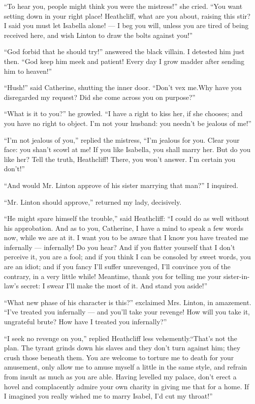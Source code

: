 \par “To hear you, people might think you were the mistress!” she cried. “You want setting down in your right place! Heathcliff, what are you about, raising this stir? I said you must let Isabella alone! — I beg you will, unless you are tired of being received here, and wish Linton to draw the bolts against you!”
\par “God forbid that he should try!” answered the black villain. I detested him just then. “God keep him meek and patient! Every day I grow madder after sending him to heaven!”
\par “Hush!” said Catherine, shutting the inner door. “Don't vex me.Why have you disregarded my request? Did she come across you on purpose?”
\par “What is it to you?” he growled. “I have a right to kiss her, if she chooses; and you have no right to object. I'm not your husband: you needn't be jealous of me!”
\par “I'm not jealous of you,” replied the mistress, “I'm jealous for you. Clear your face: you shan't scowl at me! If you like Isabella, you shall marry her. But do you like her? Tell the truth, Heathcliff! There, you won't answer. I'm certain you don't!”
\par “And would Mr. Linton approve of his sister marrying that man?” I inquired.
\par “Mr. Linton should approve,” returned my lady, decisively.
\par “He might spare himself the trouble,” said Heathcliff: “I could do as well without his approbation. And as to you, Catherine, I have a mind to speak a few words now, while we are at it. I want you to be aware that I know you have treated me infernally — infernally! Do you hear? And if you flatter yourself that I don't perceive it, you are a fool; and if you think I can be consoled by sweet words, you are an idiot; and if you fancy I'll suffer unrevenged, I'll convince you of the contrary, in a very little while! Meantime, thank you for telling me your sister-in-law's secret: I swear I'll make the most of it. And stand you aside!”
\par “What new phase of his character is this?” exclaimed Mrs. Linton, in amazement. “I've treated you infernally — and you'll take your revenge! How will you take it, ungrateful brute? How have I treated you infernally?”
\par “I seek no revenge on you,” replied Heathcliff less vehemently.“That's not the plan. The tyrant grinds down his slaves and they don't turn against him; they crush those beneath them. You are welcome to torture me to death for your amusement, only allow me to amuse myself a little in the same style, and refrain from insult as much as you are able. Having levelled my palace, don't erect a hovel and complacently admire your own charity in giving me that for a home. If I imagined you really wished me to marry Isabel, I'd cut my throat!”
